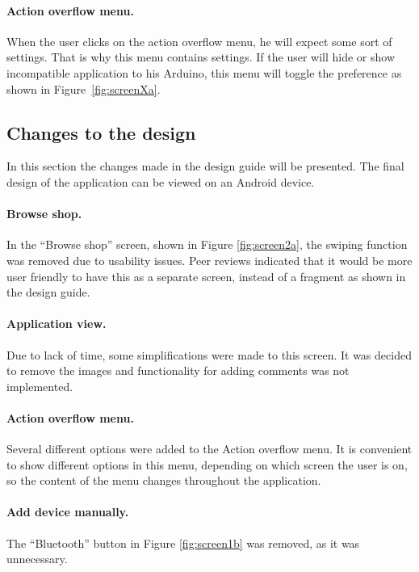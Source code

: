 	\paragraph{Action overflow menu.}
	When the user clicks on the action overflow menu, he will expect some sort of settings. That is why this menu contains settings. If the user will hide or show incompatible application to his Arduino, this menu will toggle the preference as shown in Figure~\ref{fig:screenXa}.

	\subsection{Changes to the design}
	\label{designchanges}
	In this section the changes made in the design guide will be presented. The final design of the application can be viewed on an Android device.

	\paragraph{Browse shop.}
	In the ``Browse shop'' screen, shown in Figure \ref{fig:screen2a}, the swiping function was removed due to usability issues. Peer reviews indicated that it would be more user friendly to have this as a separate screen, instead of a fragment as shown in the design guide.
	
	\paragraph{Application view.}
	Due to lack of time, some simplifications were made to this screen. It was decided to remove the images and functionality for adding comments was not implemented. 
	
	\paragraph{Action overflow menu.}
	Several different options were added to the Action overflow menu. It is convenient to show different options in this menu, depending on which screen the user is on, so the content of the menu changes throughout the application.

	\paragraph{Add device manually.}
	The ``Bluetooth'' button in Figure \ref{fig:screen1b} was removed, as it was unnecessary.

